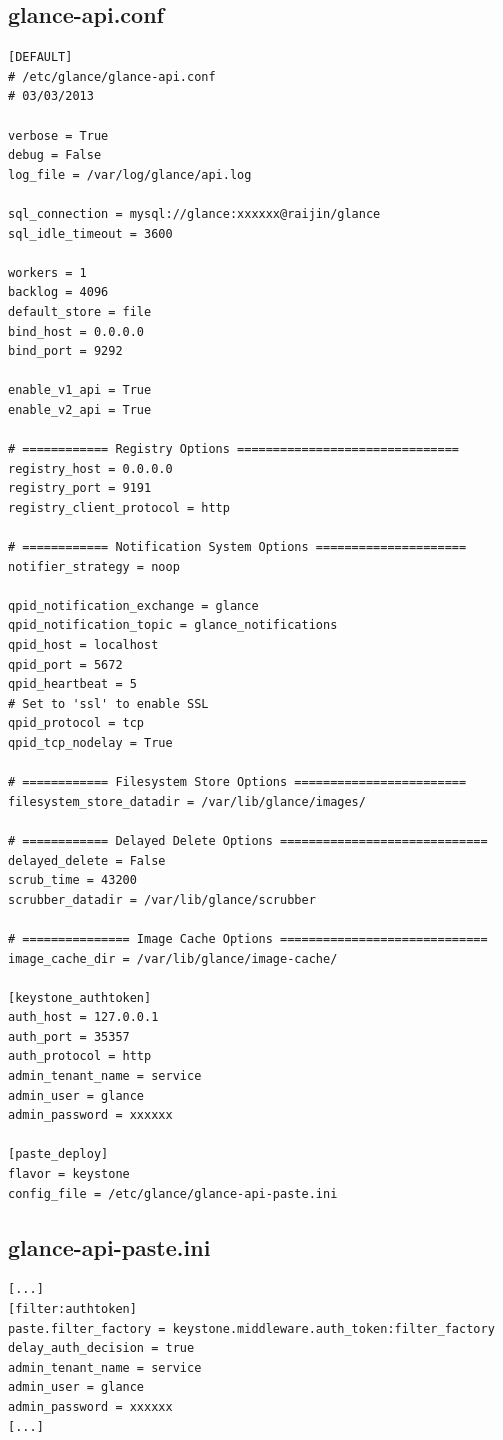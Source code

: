 \documentclass[a4paper,oneside]{report}
\begin{document}
\subsection{glance-api.conf}
\begin{verbatim}
[DEFAULT]
# /etc/glance/glance-api.conf
# 03/03/2013

verbose = True
debug = False
log_file = /var/log/glance/api.log

sql_connection = mysql://glance:xxxxxx@raijin/glance
sql_idle_timeout = 3600

workers = 1
backlog = 4096
default_store = file
bind_host = 0.0.0.0
bind_port = 9292

enable_v1_api = True
enable_v2_api = True

# ============ Registry Options ===============================
registry_host = 0.0.0.0
registry_port = 9191
registry_client_protocol = http

# ============ Notification System Options =====================
notifier_strategy = noop

qpid_notification_exchange = glance
qpid_notification_topic = glance_notifications
qpid_host = localhost
qpid_port = 5672
qpid_heartbeat = 5
# Set to 'ssl' to enable SSL
qpid_protocol = tcp
qpid_tcp_nodelay = True

# ============ Filesystem Store Options ========================
filesystem_store_datadir = /var/lib/glance/images/

# ============ Delayed Delete Options =============================
delayed_delete = False
scrub_time = 43200
scrubber_datadir = /var/lib/glance/scrubber

# =============== Image Cache Options =============================
image_cache_dir = /var/lib/glance/image-cache/

[keystone_authtoken]
auth_host = 127.0.0.1
auth_port = 35357
auth_protocol = http
admin_tenant_name = service
admin_user = glance
admin_password = xxxxxx

[paste_deploy]
flavor = keystone
config_file = /etc/glance/glance-api-paste.ini
\end{verbatim}

\subsection{glance-api-paste.ini}
\begin{verbatim}
[...]
[filter:authtoken]
paste.filter_factory = keystone.middleware.auth_token:filter_factory
delay_auth_decision = true
admin_tenant_name = service
admin_user = glance
admin_password = xxxxxx
[...]
\end{verbatim}
\end{document}

